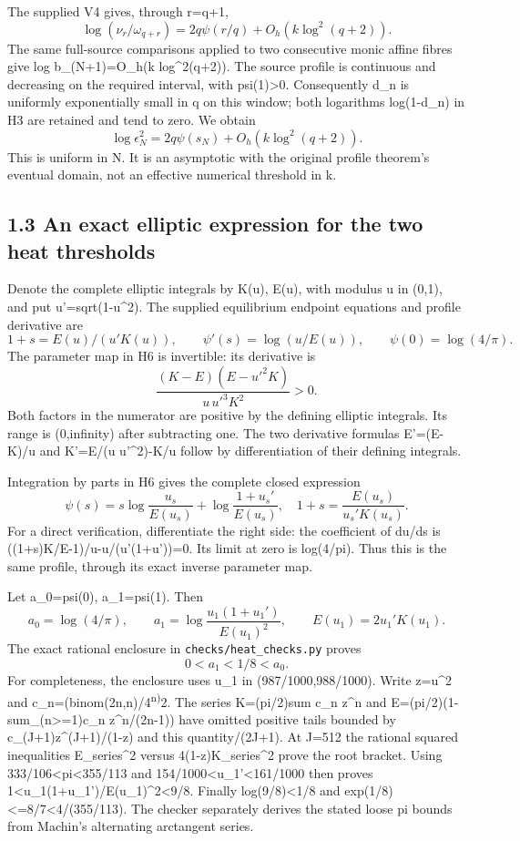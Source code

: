 The supplied V4 gives, through r=q+1, \[
 \log(\nu_r/\omega_{q+r})=2q\psi(r/q)+O_h(k\log^2(q+2)).
 \tag{H4}
\] The same full-source comparisons applied to two consecutive monic affine fibres give log b\_(N+1)=O\_h(k log\^{}2(q+2)). The source profile is continuous and decreasing on the required interval, with psi(1)\textgreater0. Consequently d\_n is uniformly exponentially small in q on this window; both logarithms log(1-d\_n) in H3 are retained and tend to zero. We obtain \[
 \boxed{\log\epsilon_N^2=2q\psi(s_N)+O_h(k\log^2(q+2)).}
 \tag{H5}
\] This is uniform in N. It is an asymptotic with the original profile theorem's eventual domain, not an effective numerical threshold in k.

\subsection{1.3 An exact elliptic expression for the two heat thresholds}\label{an-exact-elliptic-expression-for-the-two-heat-thresholds}

Denote the complete elliptic integrals by K(u), E(u), with modulus u in (0,1), and put u'=sqrt(1-u\^{}2). The supplied equilibrium endpoint equations and profile derivative are \[
 1+s=E(u)/(u'K(u)),\qquad \psi'(s)=\log(u/E(u)),\qquad \psi(0)=\log(4/\pi).
 \tag{H6}
\] The parameter map in H6 is invertible: its derivative is \[
 \frac{(K-E)(E-u'^2K)}{u\,u'^3K^2}>0.
\] Both factors in the numerator are positive by the defining elliptic integrals. Its range is (0,infinity) after subtracting one. The two derivative formulas E'=(E-K)/u and K'=E/(u u'\^{}2)-K/u follow by differentiation of their defining integrals.

Integration by parts in H6 gives the complete closed expression \[
 \boxed{\psi(s)=s\log\frac{u_s}{E(u_s)}+
                   \log\frac{1+u_s'}{E(u_s)},\quad
       1+s=\frac{E(u_s)}{u_s'K(u_s)}.}
 \tag{H7}
\] For a direct verification, differentiate the right side: the coefficient of du/ds is ((1+s)K/E-1)/u-u/(u'(1+u'))=0. Its limit at zero is log(4/pi). Thus this is the same profile, through its exact inverse parameter map.

Let a\_0=psi(0), a\_1=psi(1). Then \[
 a_0=\log(4/\pi),\qquad
 a_1=\log\frac{u_1(1+u_1')}{E(u_1)^2},\qquad
 E(u_1)=2u_1'K(u_1).
 \tag{H8}
\] The exact rational enclosure in \texttt{checks/heat\_checks.py} proves \[
 \boxed{0<a_1<1/8<a_0.}\tag{H9}
\] For completeness, the enclosure uses u\_1 in (987/1000,988/1000). Write z=u\^{}2 and c\_n=(binom(2n,n)/4\textsuperscript{n)}2. The series K=(pi/2)sum c\_n z\^{}n and E=(pi/2)(1-sum\_(n\textgreater=1)c\_n z\^{}n/(2n-1)) have omitted positive tails bounded by c\_(J+1)z\^{}(J+1)/(1-z) and this quantity/(2J+1). At J=512 the rational squared inequalities E\_series\^{}2 versus 4(1-z)K\_series\^{}2 prove the root bracket. Using 333/106\textless pi\textless355/113 and 154/1000\textless u\_1'\textless161/1000 then proves 1\textless u\_1(1+u\_1')/E(u\_1)\^{}2\textless9/8. Finally log(9/8)\textless1/8 and exp(1/8)\textless=8/7\textless4/(355/113). The checker separately derives the stated loose pi bounds from Machin's alternating arctangent series.

